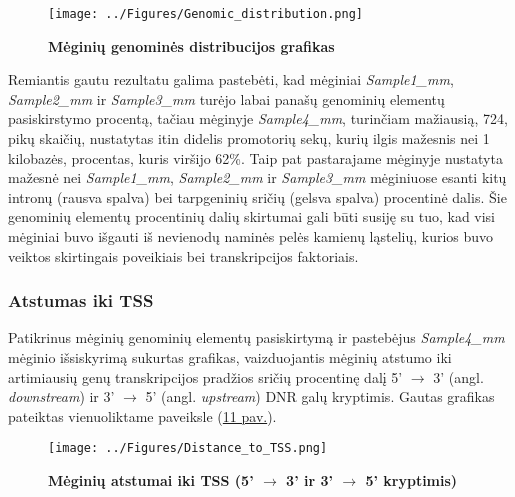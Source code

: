 \documentclass[12pt]{article}
\begin{document}
\begin{figure}[ht]
    \begin{center}
        \captionsetup{justification=centering}
        \texttt{[image: ../Figures/Genomic\_distribution.png]}
        \vspace{-1.5\baselineskip}
        \caption{\small\textbf{Mėginių genominės distribucijos
                                grafikas}}
        \label{fig:image10}
    \end{center}
\end{figure}

Remiantis gautu rezultatu galima pastebėti, kad mėginiai \emph{Sample1\_mm},
\emph{Sample2\_mm} ir \emph{Sample3\_mm} turėjo labai panašų genominių elementų
pasiskirstymo procentą, tačiau mėginyje \emph{Sample4\_mm}, turinčiam mažiausią,
724, pikų skaičių, nustatytas itin didelis promotorių sekų, kurių ilgis mažesnis
nei 1 kilobazės, procentas, kuris viršijo 62\%. Taip pat pastarajame mėginyje
nustatyta mažesnė nei \emph{Sample1\_mm}, \emph{Sample2\_mm} ir
\emph{Sample3\_mm} mėginiuose esanti kitų intronų (rausva spalva) bei
tarpgeninių sričių (gelsva spalva) procentinė dalis. Šie genominių elementų
procentinių dalių skirtumai gali būti susiję su tuo, kad visi mėginiai buvo
išgauti iš nevienodų naminės pelės kamienų ląstelių, kurios buvo veiktos
skirtingais poveikiais bei transkripcijos faktoriais.

\newpage

\subsubsection*{Atstumas iki TSS}
Patikrinus mėginių genominių elementų pasiskirtymą ir pastebėjus
\emph{Sample4\_mm} mėginio išsiskyrimą sukurtas grafikas, vaizduojantis mėginių
atstumo iki artimiausių genų transkripcijos pradžios sričių procentinę dalį
5' \(\rightarrow\) 3' (angl. \emph{downstream}) ir 3' \(\rightarrow\) 5'
(angl. \emph{upstream}) DNR galų kryptimis. Gautas grafikas pateiktas
vienuoliktame paveiksle (\hyperref[fig:image1]{11 pav.}).

\begin{figure}[ht]
    \begin{center}
        \captionsetup{justification=centering}
        \texttt{[image: ../Figures/Distance\_to\_TSS.png]}
        \vspace{-1.5\baselineskip}
        \caption{\small\textbf{Mėginių atstumai iki TSS
                                (5' \(\rightarrow\) 3' ir
                                3' \(\rightarrow\) 5' kryptimis)}}
        \label{fig:image11}
    \end{center}
\end{figure}
\end{document}
